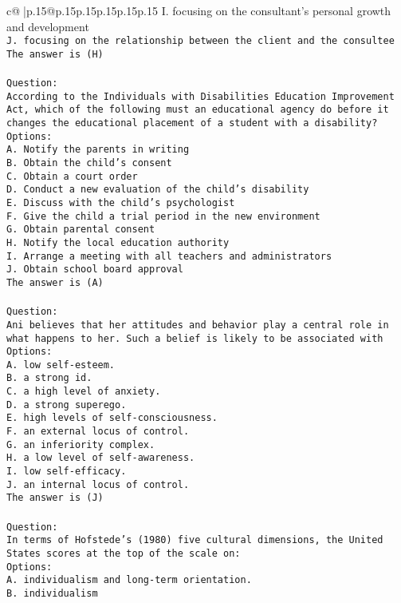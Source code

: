\documentclass{article}
\begin{document}
{\begin{supertabular}{c@{$\;$}|p{.15\linewidth}@{}p{.15\linewidth}p{.15\linewidth}p{.15\linewidth}p{.15\linewidth}p{.15\linewidth}}
{{{I. focusing on the consultant's personal growth and development\\ \tt J. focusing on the relationship between the client and the consultee\\ \tt The answer is (H)\\ \tt \\ \tt Question:\\ \tt According to the Individuals with Disabilities Education Improvement Act, which of the following must an educational agency do before it changes the educational placement of a student with a disability?\\ \tt Options:\\ \tt A. Notify the parents in writing\\ \tt B. Obtain the child's consent\\ \tt C. Obtain a court order\\ \tt D. Conduct a new evaluation of the child's disability\\ \tt E. Discuss with the child's psychologist\\ \tt F. Give the child a trial period in the new environment\\ \tt G. Obtain parental consent\\ \tt H. Notify the local education authority\\ \tt I. Arrange a meeting with all teachers and administrators\\ \tt J. Obtain school board approval\\ \tt The answer is (A)\\ \tt \\ \tt Question:\\ \tt Ani believes that her attitudes and behavior play a central role in what happens to her. Such a belief is likely to be associated with\\ \tt Options:\\ \tt A. low self-esteem.\\ \tt B. a strong id.\\ \tt C. a high level of anxiety.\\ \tt D. a strong superego.\\ \tt E. high levels of self-consciousness.\\ \tt F. an external locus of control.\\ \tt G. an inferiority complex.\\ \tt H. a low level of self-awareness.\\ \tt I. low self-efficacy.\\ \tt J. an internal locus of control.\\ \tt The answer is (J)\\ \tt \\ \tt Question:\\ \tt In terms of Hofstede’s (1980) five cultural dimensions, the United States scores at the top of the scale on:\\ \tt Options:\\ \tt A. individualism and long-term orientation.\\ \tt B. individualism }}}
\end{supertabular}}
\end{document}
